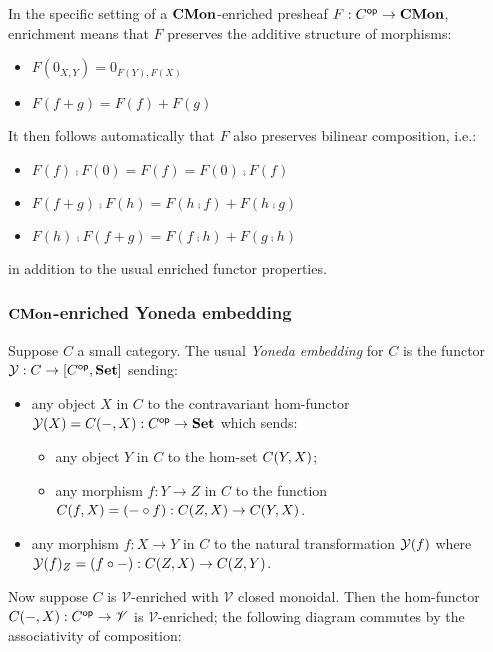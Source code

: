 In the specific setting of a $\mathbf{CMon}$-enriched presheaf $F: C^{\mathsf{op}} \to \mathbf{CMon}$, enrichment means that $F$
preserves the additive structure of morphisms:
\begin{itemize}
\item $F(0_{X,Y}) = 0_{F(Y),F(X)}$
\item $F(f + g) = F(f) + F(g)$
\end{itemize}
It then follows automatically that $F$ also preserves bilinear composition, i.e.:
\begin{itemize}
\item $F(f) \comp F(0) = F(f) = F(0) \comp F(f)$
\item $F(f + g) \comp F(h) = F(h \comp f) + F(h \comp g)$
\item $F(h) \comp F(f + g) = F(f \comp h) + F(g \comp h)$
\end{itemize}
in addition to the usual enriched functor properties.

\subsubsection{$\mathbf{CMon}$-enriched Yoneda embedding}

Suppose $C$ a small category. The usual \emph{Yoneda embedding} for $C$ is the functor $\mathcal{Y}: C \to
[C^{\mathsf{op}},\mathbf{Set}]$ sending:
\begin{itemize}
\item any object $X$ in $C$ to the contravariant hom-functor $\mathcal{Y}(X) = {C}(-,X): C^{\mathsf{op}} \to \mathbf{Set}$
which sends:
   \begin{itemize}
   \item any object $Y$ in $C$ to the hom-set ${C}(Y,X)$;
   \item any morphism $f: Y \to Z$ in $C$ to the function ${C}(f,X) = (- \circ f): {C}(Z,X) \to
   {C}(Y,X)$.
   \end{itemize}
\item any morphism $f: X \to Y$ in $C$ to the natural transformation $\mathcal{Y}(f)$ where $\mathcal{Y}(f)_Z = (f
\circ -): {C}(Z,X) \to {C}(Z,Y)$.
\end{itemize}

\noindent Now suppose $C$ is $\mathscr{V}$-enriched with $\mathscr{V}$ closed monoidal. Then the hom-functor
${C}(-,X): C^{\mathsf{op}} \to \mathscr{V}$ is $\mathscr{V}$-enriched; the following diagram commutes by the
associativity of composition:

\begin{center}
\end{center}

